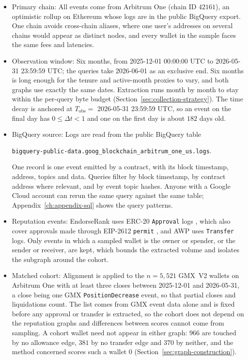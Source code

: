\begin{itemize}
\item Primary chain: All events come from Arbitrum One (chain ID $42161$), an optimistic rollup on Ethereum  whose logs are in the public BigQuery export. One chain avoids cross-chain aliases, where one user's addresses on several chains would appear as distinct nodes, and every wallet in the sample faces the same fees and latencies.

\item Observation window: Six months, from 2025-12-01 00:00:00 UTC to 2026-05-31 23:59:59 UTC; the queries take 2026-06-01 as an exclusive end. Six months is long enough for the tenure and active-month proxies to vary, and both graphs use exactly the same dates. Extraction runs month by month to stay within the per-query byte budget (Section~\ref{sec:collection-strategy}). The time decay is anchored at $T_{\mathrm{obs}}=$ 2026-05-31 23:59:59 UTC, so an event on the final day has $0\le\Delta t<1$ and one on the first day is about $182$ days old.

\item BigQuery source: Logs are read from the public BigQuery table
\begin{center}
\texttt{bigquery-public-data.goog\_blockchain\_arbitrum\_one\_us.logs}.
\end{center}
One record is one event emitted by a contract, with its block timestamp, address, topics and data. Queries filter by block timestamp, by contract address where relevant, and by event topic hashes. Anyone with a Google Cloud account can rerun the same query against the same table; Appendix~\ref{ch:appendix-sql} shows the query patterns.

\item Reputation events: EndorseRank uses ERC-20 \texttt{Approval} logs , which also cover approvals made through EIP-2612 \texttt{permit} , and AWP uses \texttt{Transfer} logs. Only events in which a sampled wallet is the owner or spender, or the sender or receiver, are kept, which bounds the extracted volume and isolates the subgraph around the cohort.

\item Matched cohort: Alignment is applied to the $n=5{,}521$ GMX~V2 wallets on Arbitrum One with at least three closes between 2025-12-01 and 2026-05-31, a close being one GMX \texttt{PositionDecrease} event, so that partial closes and liquidations count. The list comes from GMX event data alone and is fixed before any approval or transfer is extracted, so the cohort does not depend on the reputation graphs and differences between scores cannot come from sampling. A cohort wallet need not appear in either graph: $966$ are touched by no allowance edge, $381$ by no transfer edge and $370$ by neither, and the method concerned scores such a wallet $0$ (Section~\ref{sec:graph-construction}).


\end{itemize}

